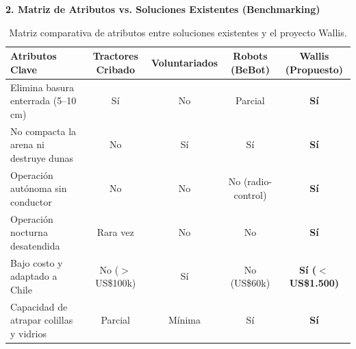 \documentclass[12pt,letterpaper]{article}
\begin{document}
\vspace{0.2cm}
\noindent\textbf{2. Matriz de Atributos vs. Soluciones Existentes (Benchmarking)}
\begin{table}[h!]
\centering
\small
{}
\begin{tabularx}{\textwidth}{X c c c c}
\toprule
\textbf{Atributos Clave} & \textbf{Tractores Cribado} & \textbf{Voluntariados} & \textbf{Robots (BeBot)} & \textbf{Wallis (Propuesto)} \\
\midrule
Elimina basura enterrada (5--10 cm) & Sí & No & Parcial & \textbf{Sí} \\
No compacta la arena ni destruye dunas & No & Sí & Sí & \textbf{Sí} \\
Operación autónoma sin conductor & No & No & No (radio-control) & \textbf{Sí} \\
Operación nocturna desatendida & Rara vez & No & No & \textbf{Sí} \\
Bajo costo y adaptado a Chile & No ($>$US\$100k) & Sí & No (US\$60k) & \textbf{Sí ($<$US\$1.500)} \\
Capacidad de atrapar colillas y vidrios & Parcial & Mínima & Sí & \textbf{Sí} \\
\bottomrule
\end{tabularx}
\caption{Matriz comparativa de atributos entre soluciones existentes y el proyecto Wallis.}
\label{tab:benchmarking}
\end{table}
\end{document}
